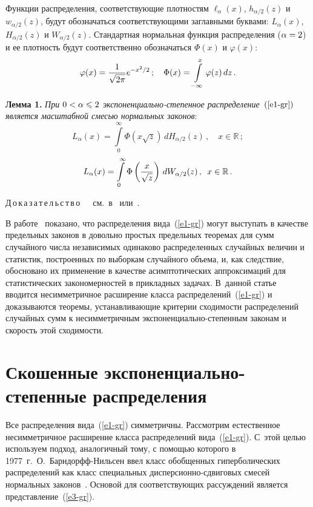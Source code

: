 \begin{multicols}{2}
Функции распределения, соответствующие плотностям $\ell_{\alpha}(x)$, 
$h_{\alpha/2}(z)$ и $w_{\alpha/2}(z)$, будут обозначаться соответствующими 
заглавными буквами: $L_{\alpha}(x)$, $H_{\alpha/2}(z)$ и $W_{\alpha/2}(z)$. 
Стандартная нормальная функция распределения ($\alpha\hm=2$) и ее плотность будут 
соответственно обозначаться $\Phi(x)$ и $\varphi(x)$:
$$
\varphi(x)=\displaystyle\frac{\displaystyle 1\mathstrut}{\displaystyle \sqrt{2\pi}\mathstrut}e^{-x^2/2}\,;\quad 
\Phi(x)=\int\limits_{-\infty}^x\varphi(z)\,dz\,.
$$

\smallskip

\noindent
\textbf{Лемма 1.} \textit{При $0\hm<\alpha\hm\leqslant2$ экс\-по\-нен\-ци\-аль\-но-сте\-пен\-ное
распределение~$(\ref{e1-gr})$ является масштабной смесью нормальных законов}:
$$
L_{\alpha}(x)=\int\limits_0^{\infty}\Phi\left(x\sqrt{z}\right)\,dH_{\alpha/2}(z)\,,\quad
 x\in\mathbb{R}\,;
$$
\begin{equation}
L_{\alpha}(x)=\int\limits_0^{\infty}\Phi\left(\displaystyle\frac{\displaystyle x\mathstrut}{\displaystyle \sqrt{z}\mathstrut}\right)\,dW_{\alpha/2}(z)\,,\enskip
x\in\mathbb{R}\,.\label{e3-gr}
\end{equation}

\smallskip

\noindent
Д\,о\,к\,а\,з\,а\,т\,е\,л\,ь\,с\,т\,в\,о\ \ \ см.\ в~\cite{West1987} или~\cite{KBZZ2012}.

\smallskip

В работе~\cite{KBZZ2012} показано, что распределения вида~(\ref{e1-gr}) могут
выступать в качестве предельных законов в довольно простых
предельных теоремах для сумм случайного числа независимых одинаково
распределенных случайных величин и статистик, построенных по
выборкам случайного объема, и, как следствие, обосновано их
применение в качестве асимптотических аппроксимаций для
статистических закономерностей в прикладных задачах. В~данной статье
вводится несимметричное расширение класса распределений~(\ref{e1-gr}) и
доказываются теоремы, устанавливающие критерии сходимости
распределений случайных сумм к несимметричным
экс\-по\-нен\-ци\-аль\-но-сте\-пен\-ным законам и скорость этой сходимости.

\section{Скошенные экспоненциально-степенные распределения}

Все распределения вида~(\ref{e1-gr}) симметричны. Рассмотрим естественное
несимметричное расширение класса распределений вида~(\ref{e1-gr}). С~этой
\mbox{целью} используем подход, аналогичный тому, с помощью которого в 1977~г.\ 
О.~Барн\-дорфф-Ниль\-сен ввел класс обобщенных гиперболических
распределений как класс специальных дис\-пер\-си\-он\-но-сдви\-го\-вых смесей
нормальных законов~\cite{BN1977}. Основой для соответствующих
рассуждений является представление~(\ref{e3-gr}).


\end{multicols}
